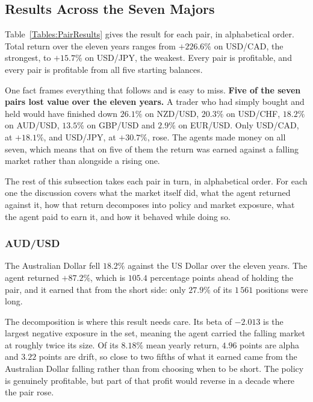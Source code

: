 \subsection{Results Across the Seven Majors}
\label{Subsection:PairResults}

Table~\ref{Tables:PairResults} gives the result for each pair, in alphabetical order. Total return over the eleven years ranges from $+226.6\%$ on USD/CAD, the strongest, to $+15.7\%$ on USD/JPY, the weakest. Every pair is profitable, and every pair is profitable from all five starting balances.



One fact frames everything that follows and is easy to miss. \textbf{Five of the seven pairs lost value over the eleven years.} A trader who had simply bought and held would have finished down $26.1\%$ on NZD/USD, $20.3\%$ on USD/CHF, $18.2\%$ on AUD/USD, $13.5\%$ on GBP/USD and $2.9\%$ on EUR/USD. Only USD/CAD, at $+18.1\%$, and USD/JPY, at $+30.7\%$, rose. The agents made money on all seven, which means that on five of them the return was earned against a falling market rather than alongside a rising one.



The rest of this subsection takes each pair in turn, in alphabetical order. For each one the discussion covers what the market itself did, what the agent returned against it, how that return decomposes into policy and market exposure, what the agent paid to earn it, and how it behaved while doing so.

\subsubsection{AUD/USD}

The Australian Dollar fell $18.2\%$ against the US Dollar over the eleven years. The agent returned $+87.2\%$, which is $105.4$ percentage points ahead of holding the pair, and it earned that from the short side: only $27.9\%$ of its $1\,561$ positions were long.

The decomposition is where this result needs care. Its beta of $-2.013$ is the largest negative exposure in the set, meaning the agent carried the falling market at roughly twice its size. Of its $8.18\%$ mean yearly return, $4.96$ points are alpha and $3.22$ points are drift, so close to two fifths of what it earned came from the Australian Dollar falling rather than from choosing when to be short. The policy is genuinely profitable, but part of that profit would reverse in a decade where the pair rose.

